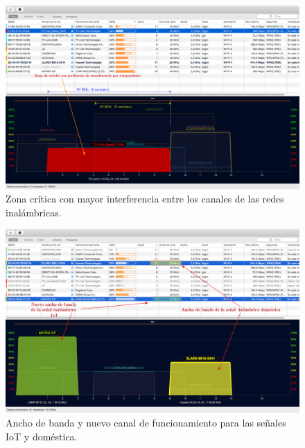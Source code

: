 \begin{landscape} %
\begin{figure}[htpb]
\centering 
\includegraphics[width=1.5\textwidth]{./Figures/wifi/04.png}
\caption{Zona crítica con mayor interferencia entre los canales de las redes inalámbricas.}
\label{fig:test04}
\end{figure}
\end{landscape} %



\begin{landscape} %
\begin{figure}[htpb]
\centering 
\includegraphics[width=1.5\textwidth]{./Figures/wifi/05.png}
\caption{Ancho de banda y nuevo canal de funcionamiento para las señales IoT y doméstica.}
\label{fig:test05}
\end{figure}
\end{landscape} %


